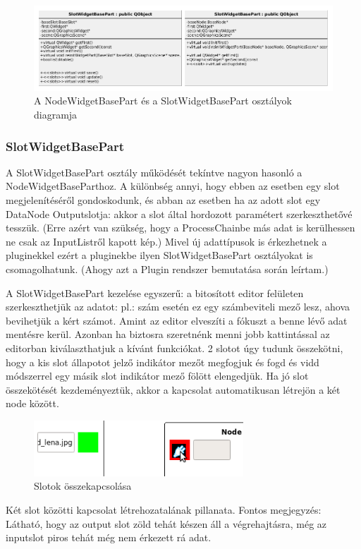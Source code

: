 \documentclass[a4paper,12pt,oneside]{report}
\begin{document}
\begin{center}
\begin{figure}[h]
  \includegraphics[width=1.1\textwidth]{node_slot_widgetpart.png}
  \caption{A NodeWidgetBasePart és a SlotWidgetBasePart osztályok diagramja}

  \label{fig:bimg_widget_slot_view_diag}
\end{figure}
\end{center}

\subsubsection{SlotWidgetBasePart}
A SlotWidgetBasePart osztály működését tekíntve nagyon hasonló a NodeWidgetBaseParthoz. A különbség annyi, hogy ebben az esetben egy slot megjelenítéséről gondoskodunk, és abban az esetben ha az adott slot egy DataNode Outputslotja: akkor a slot által hordozott paramétert szerkeszthetővé tesszük. (Erre azért van szükség, hogy a ProcessChainbe más adat is kerülhessen ne csak az InputListről kapott kép.) Mivel új adattípusok is érkezhetnek a pluginekkel ezért a pluginekbe ilyen SlotWidgetBasePart osztályokat is csomagolhatunk. (Ahogy azt a Plugin rendszer bemutatása során leírtam.)

A SlotWidgetBasePart kezelése egyszerű: a bitosított editor felületen szerkeszthetjük az adatot: pl.: szám esetén ez egy számbeviteli mező lesz, ahova bevihetjük a kért számot. Amint az editor elveszíti a fókuszt a benne lévő adat mentésre kerül. Azonban ha biztosra szeretnénk menni jobb kattintással az editorban kiválaszthatjuk a kívánt funkciókat.
2 slotot úgy tudunk összekötni, hogy a kis slot állapotot jelző indikátor mezőt megfogjuk és fogd és vidd módszerrel egy másik slot indikátor mező fölött elengedjük. Ha jó slot összekötését kezdeményeztük, akkor a kapcsolat automatikusan létrejön a két node között.

\begin{center}
\begin{figure}[h]
  \includegraphics[width=0.7\textwidth]{connection.png}
  \caption{Slotok összekapcsolása}

  \label{fig:bimg_just connection}
\end{figure}
\end{center}
Két slot közötti kapcsolat létrehozatalának pillanata. Fontos megjegyzés: Látható, hogy az output slot zöld tehát készen áll a végrehajtásra, még az inputslot piros tehát még nem érkezett rá adat.
\end{document}
